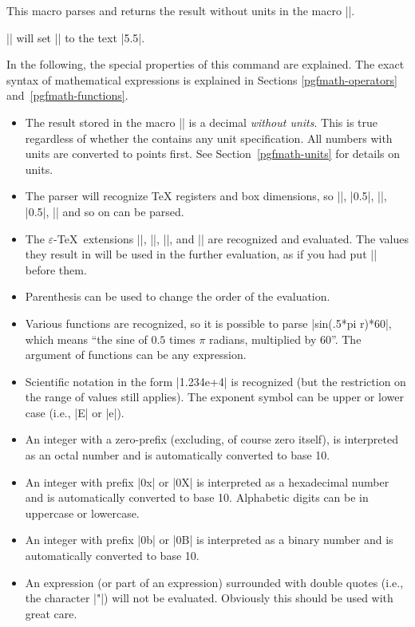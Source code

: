 \begin{command}{\pgfmathparse{}}
    This macro parses  and returns the result without units in
    the macro |\pgfmathresult|.

    \example |\pgfmathparse{2pt+3.5pt}| will set |\pgfmathresult| to the text
    |5.5|.

    In the following, the special properties of this command are explained. The
    exact syntax of mathematical expressions is explained in Sections
    \ref{pgfmath-operators} and~\ref{pgfmath-functions}.
    \begin{itemize}
        \item The result stored in the macro |\pgfmathresult| is a decimal
            \emph{without units}. This is true regardless of whether the
             contains any unit specification. All numbers with
            units are converted to points first. See
            Section~\ref{pgfmath-units} for details on units.
        \item The parser will recognize \TeX{} registers and box dimensions, so
            |\mydimen|, |0.5\mydimen|, |\wd\mybox|, |0.5\dp\mybox|,
            |\mycount\mydimen| and so on can be parsed.
        \item The $\varepsilon$-TeX\ extensions |\dimexpr|, |\numexpr|,
            |\glueexpr|, and |\muexpr| are recognized and evaluated. The values
            they result in will be used in the further evaluation, as if you
            had put |\the| before them.
        \item Parenthesis can be used to change the order of the evaluation.
        \item Various functions are recognized, so it is possible to parse
            |sin(.5*pi r)*60|, which means ``the sine of $0.5$ times $\pi$
            radians, multiplied by 60''. The argument of functions can be any
            expression.
        \item Scientific notation in the form |1.234e+4| is recognized (but the
            restriction on the range of values still applies). The exponent
            symbol can be upper or lower case (i.e., |E| or |e|).
        \item An integer with a zero-prefix (excluding, of course zero itself),
            is interpreted as an octal number and is automatically converted to
            base 10.
        \item An integer with prefix |0x| or |0X| is interpreted as a
            hexadecimal number and is automatically converted to base 10.
            Alphabetic digits can be in uppercase or lowercase.
        \item An integer with prefix |0b| or |0B| is interpreted as a binary
            number and is automatically converted to base 10.
        \item An expression (or part of an expression) surrounded with double
            quotes (i.e., the character |"|) will not be evaluated. Obviously
            this should be used with great care.
    \end{itemize}
\end{command}

